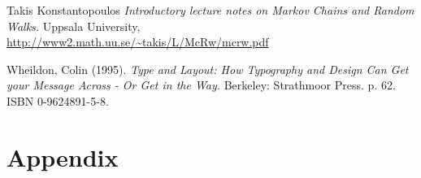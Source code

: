 \documentclass[titlepage]{report}
\begin{document}
\begin{thebibliography}{1}

	 Takis Konstantopoulos {\em Introductory lecture notes on
		Markov Chains and Random Walks.} Uppsala University,
		\\\url{http://www2.math.uu.se/~takis/L/McRw/mcrw.pdf}

     Wheildon, Colin (1995). \emph{Type and Layout: How Typography and Design Can Get your Message Across - Or Get in the Way.} Berkeley: Strathmoor Press. p. 62. ISBN 0-9624891-5-8.

\end{thebibliography}


\clearpage
\section*{Appendix}
\end{document}
